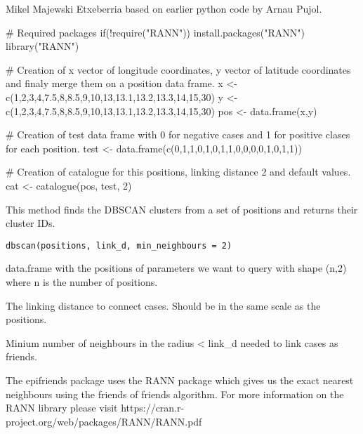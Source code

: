 \documentclass[a4paper]{book}
\begin{document}
%
\begin{Author}\relax
Mikel Majewski Etxeberria based on earlier python code by Arnau Pujol.
\end{Author}
%
\begin{Examples}
\begin{ExampleCode}
# Required packages
if(!require("RANN")) install.packages("RANN")
library("RANN")

# Creation of x vector of longitude coordinates, y vector of latitude coordinates and finaly merge them on a position data frame.
x <- c(1,2,3,4,7.5,8,8.5,9,10,13,13.1,13.2,13.3,14,15,30)
y <- c(1,2,3,4,7.5,8,8.5,9,10,13,13.1,13.2,13.3,14,15,30)
pos <- data.frame(x,y)

# Creation of test data frame with 0 for negative cases and 1 for positive clases for each position.
test <- data.frame(c(0,1,1,0,1,0,1,1,0,0,0,0,1,0,1,1))

# Creation of catalogue for this positions, linking distance 2 and default values.
cat <- catalogue(pos, test, 2)
\end{ExampleCode}
\end{Examples}
%
\begin{Description}\relax
This method finds the DBSCAN clusters from a set of positions and returns their cluster IDs.
\end{Description}
%
\begin{Usage}
\begin{verbatim}
dbscan(positions, link_d, min_neighbours = 2)
\end{verbatim}
\end{Usage}
%
\begin{Arguments}
\begin{ldescription}
\item[\code{positions}] data.frame with the positions of parameters we want to query with shape (n,2) where n is the number of positions.

\item[\code{link\_d:}] The linking distance to connect cases. Should be in the same scale as the positions.

\item[\code{min\_neighbours:}] Minium number of neighbours in the radius < link\_d needed to link cases as friends.
\end{ldescription}
\end{Arguments}
%
\begin{Details}\relax
The epifriends package uses the RANN package which gives us the exact nearest neighbours using the friends of friends algorithm. For more information on the RANN library please visit https://cran.r-project.org/web/packages/RANN/RANN.pdf
\end{Details}
\end{document}
